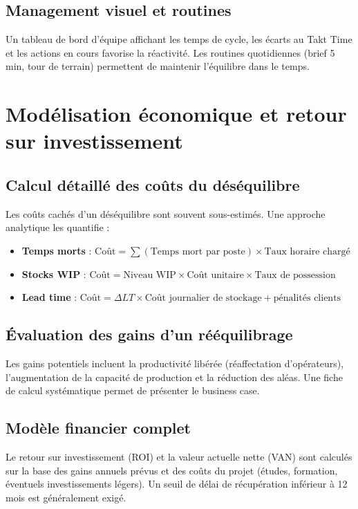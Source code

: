 \documentclass[12pt,a4paper]{article}
\begin{document}
\begin{center}
\subsection{Management visuel et routines}
Un tableau de bord d’équipe affichant les temps de cycle, les écarts au Takt Time et les actions en cours favorise la réactivité. Les routines quotidiennes (brief 5 min, tour de terrain) permettent de maintenir l’équilibre dans le temps.

\section{Modélisation économique et retour sur investissement}

\subsection{Calcul détaillé des coûts du déséquilibre}
Les coûts cachés d’un déséquilibre sont souvent sous-estimés. Une approche analytique les quantifie :

\begin{itemize}
    \item \textbf{Temps morts} : \( \text{Coût} = \sum (\text{Temps mort par poste}) \times \text{Taux horaire chargé} \)
    \item \textbf{Stocks WIP} : \( \text{Coût} = \text{Niveau WIP} \times \text{Coût unitaire} \times \text{Taux de possession} \)
    \item \textbf{Lead time} : \( \text{Coût} = \Delta LT \times \text{Coût journalier de stockage} + \text{pénalités clients} \)
\end{itemize}

\subsection{Évaluation des gains d’un rééquilibrage}
Les gains potentiels incluent la productivité libérée (réaffectation d’opérateurs), l’augmentation de la capacité de production et la réduction des aléas. Une fiche de calcul systématique permet de présenter le business case.

\subsection{Modèle financier complet}
Le retour sur investissement (ROI) et la valeur actuelle nette (VAN) sont calculés sur la base des gains annuels prévus et des coûts du projet (études, formation, éventuels investissements légers). Un seuil de délai de récupération inférieur à 12 mois est généralement exigé.


\end{center}
\end{document}
